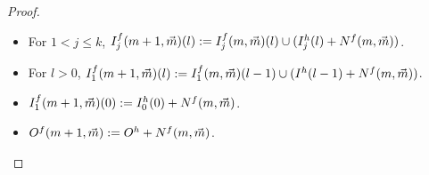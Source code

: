 \documentclass{lmcs}
\begin{document}
\begin{proof}
\begin{itemize}
		\smallskip
		
		\item For $1<j\leq k$, $I^f_j (m+1, \vec m) (l) := I^f_j (m,\vec m) (l) \cup ( I^h_j 
		(l) + N^f (m, \vec m) )$.
		\item For $l > 0$, $I^f_1 (m+1 , \vec m) (l) := I^f_1 (m , \vec m) (l-1) \cup (I^h 
		(l-1) + N^f (m, \vec m) )$.
		\item $I^f_1 (m+1, \vec m) (0) := I^h_0 
		(0) + N^f (m, \vec m) $.
		\item $O^f(m+1, \vec m) := O^h 
		+ N^f (m, \vec m)$.
		\qedhere
	\end{itemize}
\end{proof}
\end{document}

